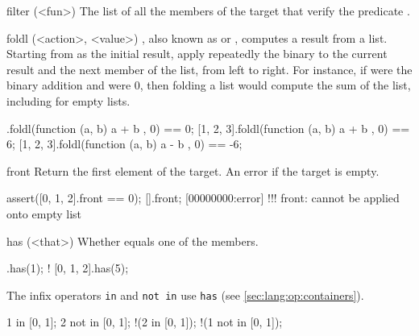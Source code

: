\begin{urbiscriptapi}
\item[filter](<fun>)%
  The list of all the members of the target that verify the predicate
  .



\item[foldl](<action>, <value>)%
  ,
  also known as  or , computes a result
  from a list.  Starting from  as the initial result, apply
  repeatedly the binary  to the current result and the
  next member of the list, from left to right.  For instance, if
   were the binary addition and  were 0, then
  folding a list would compute the sum of the list, including for
  empty lists.

\begin{urbiassert}
       [].foldl(function (a, b) { a + b }, 0) == 0;
[1, 2, 3].foldl(function (a, b) { a + b }, 0) == 6;
[1, 2, 3].foldl(function (a, b) { a - b }, 0) == -6;
\end{urbiassert}


\item[front]
  Return the first element of the target. An error if the target is
  empty.
\begin{urbiscript}
assert([0, 1, 2].front == 0);
[].front;
[00000000:error] !!! front: cannot be applied onto empty list
\end{urbiscript}


\item[has](<that>)%
  Whether \that equals one of the members.

\begin{urbiassert}
  [0, 1, 2].has(1);
! [0, 1, 2].has(5);
\end{urbiassert}

  The infix operators \lstinline|in| and \lstinline|not in| use
  \lstinline|has| (see \autoref{sec:lang:op:containers}).

\begin{urbiassert}
  1 in     [0, 1];
  2 not in [0, 1];
!(2 in     [0, 1]);
!(1 not in [0, 1]);
\end{urbiassert}



\end{urbiscriptapi}
